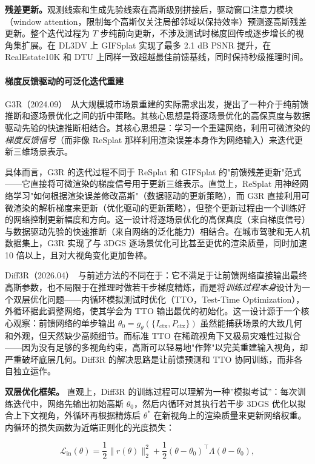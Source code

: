 \textbf{残差更新。}观测线索和生成先验线索在高斯级别拼接后，驱动窗口注意力模块（window attention，限制每个高斯仅关注局部邻域以保持效率）预测逐高斯残差更新。整个迭代过程为 $T$ 步纯前向更新，不涉及测试时梯度回传或逐步增长的视角集扩展。在 DL3DV 上 GIFSplat 实现了最多 2.1 dB PSNR 提升，在 RealEstate10K 和 DTU 上同样一致超越最佳前馈基线，同时保持秒级推理时间。

\paragraph{梯度反馈驱动的可泛化迭代重建}

G3R（2024.09）~\cite{2409_19405}从大规模城市场景重建的实际需求出发，提出了一种介于纯前馈推断和逐场景优化之间的折中策略。其核心思想是将逐场景优化的高保真度与数据驱动先验的快速推断相结合。其核心思想是：学习一个重建网络，利用可微渲染的\emph{梯度反馈信号}（而非像 ReSplat 那样利用渲染误差本身作为网络输入）来迭代更新三维场景表示。

具体而言，G3R 的迭代过程不同于 ReSplat 和 GIFSplat 的"前馈残差更新"范式——它直接将可微渲染的梯度信号用于更新三维表示。直觉上，ReSplat 用神经网络学习"如何根据渲染误差修改高斯"（数据驱动的更新策略），而 G3R 直接利用可微渲染的解析梯度来更新（优化驱动的更新策略），但整个更新过程由一个训练好的网络控制更新幅度和方向。这一设计将逐场景优化的高保真度（来自梯度信号）与数据驱动先验的快速推断（来自网络的泛化能力）相结合。在城市驾驶和无人机数据集上，G3R 实现了与 3DGS 逐场景优化可比甚至更优的渲染质量，同时加速 10 倍以上，且对大视角变化更加鲁棒。

Diff3R（2026.04）~\cite{2604_01030}与前述方法的不同在于：它不满足于让前馈网络直接输出最终高斯参数，也不局限于在推理时做若干步梯度精炼，而是将\emph{训练过程本身}设计为一个双层优化问题——内循环模拟测试时优化（TTO，Test-Time Optimization），外循环据此调整网络，使其学会为 TTO 输出最优的初始化。这一设计源于一个核心观察：前馈网络的单步输出 $\theta_0 = g_\theta(\{I_{\text{ctx}}, P_{\text{ctx}}\})$ 虽然能捕获场景的大致几何和外观，但天然缺少高频细节。而标准 TTO 在稀疏视角下又极易灾难性过拟合——因为没有足够的多视角约束，高斯可以轻易地"作弊"以完美重建输入视角，却严重破坏底层几何。Diff3R 的解决思路是让前馈预测和 TTO 协同训练，而非各自独立运作。

\textbf{双层优化框架。}
直观上，Diff3R 的训练过程可以理解为一种''模拟考试''：每次训练迭代中，网络先输出初始高斯 $\theta_0$，然后内循环对其执行若干步 3DGS 优化以拟合上下文视角，外循环再根据精炼后 $\theta^*$ 在新视角上的渲染质量来更新网络权重。内循环的损失函数为近端正则化的光度损失：

\begin{equation}
\mathcal{L}_{\text{in}}(\theta) = \frac{1}{2} \| r(\theta) \|_2^2 + \frac{1}{2} (\theta - \theta_0)^\top \Lambda (\theta - \theta_0),
\end{equation}

